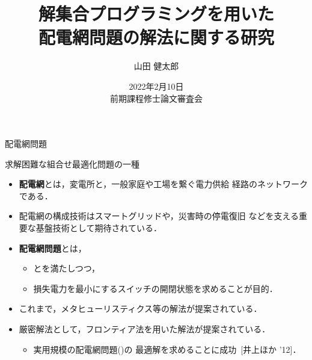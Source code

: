 \documentclass[dvipdfmx,11pt]{beamer}
\title{解集合プログラミングを用いた\\配電網問題の解法に関する研究}
\author[山田 健太郎]{山田 健太郎}
\date{2022年2月10日\\前期課程修士論文審査会}
\institute{情報システム学専攻\\番原研究室}
\begin{document}
\begin{frame}{}
  \titlepage
\end{frame}

\begin{frame}{配電網問題}
  \begin{alertblock}{}\centering
    求解困難な組合せ最適化問題の一種
  \end{alertblock}
  \vfill
  \begin{itemize}
  \item \alert{\bf 配電網}とは，変電所と，一般家庭や工場を繋ぐ電力供給
    経路のネットワークである．
  \item  配電網の構成技術はスマートグリッドや，災害時の停電復旧
         などを支える重要な基盤技術として期待されている．
  \item \alert{\bf 配電網問題}とは，
    \begin{itemize}
    \item {}とを満たしつつ，
    \item 損失電力を最小にするスイッチの開閉状態を求めることが目的．
    \end{itemize}
  \item これまで，メタヒューリスティクス等の解法が提案されている．
  \item 厳密解法として，フロンティア法を用いた解法が提案されている．
    \begin{itemize}
    \item 実用規模の配電網問題()の
      最適解を求めることに成功~[井上ほか '12]．
    \end{itemize}
  \end{itemize}
\end{frame}
\end{document}
